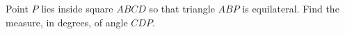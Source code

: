 Point $P$ lies inside square $ABCD$ so that triangle $ABP$ is equilateral. Find the measure, in degrees, of angle $CDP$.
